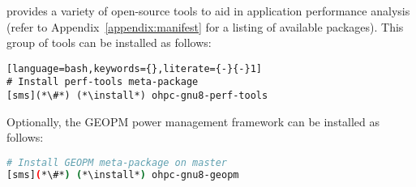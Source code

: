\OHPC{} provides a variety of open-source tools to aid in application 
performance analysis (refer to Appendix~\ref{appendix:manifest} for a listing
of available packages). This group of tools can be installed as follows:

\begin{lstlisting}[language=bash,keywords={},literate={-}{-}1]
# Install perf-tools meta-package
[sms](*\#*) (*\install*) ohpc-gnu8-perf-tools
\end{lstlisting}

Optionally, the GEOPM power management framework can be installed as follows:
\begin{lstlisting}[language=bash,keywords={},upquote=true]
# Install GEOPM meta-package on master
[sms](*\#*) (*\install*) ohpc-gnu8-geopm

\end{lstlisting}
